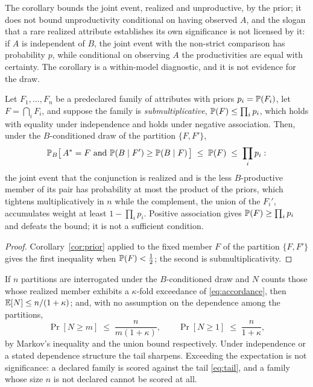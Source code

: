 \noindent The corollary bounds the joint event, realized and unproductive, by the prior; it does not bound unproductivity conditional on having observed $A$, and the slogan that a rare realized attribute establishes its own significance is not licensed by it: if $A$ is independent of $B$, the joint event with the non-strict comparison has probability $p$, while conditional on observing $A$ the productivities are equal with certainty. The corollary is a within-model
diagnostic, and it is not evidence for the draw.

\begin{proposition}\label{prop:stockpile}
Let $F_1,\dots,F_n$ be a predeclared family of attributes with priors
$p_i=\mathbb{P}(F_i)$, let $F=\bigcap_iF_i$, and suppose the family is
\emph{submultiplicative}, $\mathbb{P}(F)\le\prod_ip_i$, which holds with
equality under independence and holds under negative association. Then,
under the $B$-conditioned draw of the partition $\{F,F'\}$,
\begin{equation}\label{eq:stockpile}
\mathbb{P}_B\bigl[\,A^\ast=F\ \text{and}\ \mathbb{P}(B\mid F')\ge\mathbb{P}(B\mid F)\,\bigr]
\;\le\;\mathbb{P}(F)\;\le\;\prod_ip_i:
\end{equation}
the joint event that the conjunction is realized and is the less
$B$-productive member of its pair has probability at most the product
of the priors, which tightens multiplicatively in $n$ while the
complement, the union of the $F_i'$, accumulates weight at least $1-\prod_ip_i$.
Positive association gives $\mathbb{P}(F)\ge\prod_ip_i$ and defeats the bound;
it is not a sufficient condition.
\end{proposition}

\begin{proof}
Corollary~\ref{cor:prior} applied to the fixed member $F$ of the
partition $\{F,F'\}$ gives the first inequality when $\mathbb{P}(F)<\tfrac12$;
the second is submultiplicativity.
\end{proof}

\begin{proposition}
\label{prop:guard}
If $n$ partitions are interrogated under the $B$-conditioned draw and
$N$ counts those whose realized member exhibits a $\kappa$-fold
exceedance of \eqref{eq:accordance}, then $\mathbb{E}[N]\le n/(1+\kappa)$; and,
with no assumption on the dependence among the partitions,
\begin{equation}\label{eq:tail}
\Pr[N\ge m]\;\le\;\frac{n}{m(1+\kappa)},\qquad
\Pr[N\ge1]\;\le\;\frac{n}{1+\kappa},
\end{equation}
by Markov's inequality and the union bound respectively. Under
independence or a stated dependence structure the tail sharpens.
Exceeding the expectation is not significance: a declared family is
scored against the tail \eqref{eq:tail}, and a family whose size $n$ is
not declared cannot be scored at all.
\end{proposition}

